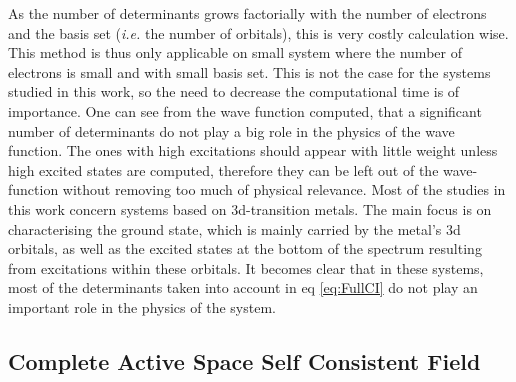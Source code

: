 \documentclass[12pt]{report}
\numberwithin{equation}{section}
\begin{document}
As the number of determinants grows factorially with the number of electrons and the basis set (\textit{i.e.} the number of orbitals), this is very costly calculation wise.
This method is thus only applicable on small system where the number of electrons is small and with small basis set.
This is not the case for the systems studied in this work, so the need to decrease the computational time is of importance.
One can see from the wave function computed, that a significant number of determinants do not play a big role in the physics of the wave function.
The ones with high excitations should appear with little weight unless high excited states are computed, therefore they can be left out of the wave-function without removing too much of physical relevance. 
Most of the studies in this work concern systems based on 3d-transition metals.
The main focus is on characterising the ground state, which is mainly carried by the metal's 3d orbitals, as well as the excited states at the bottom of the spectrum resulting from excitations within these orbitals.
It becomes clear that in these systems, most of the determinants taken into account in eq \ref{eq:FullCI} do not play an important role in the physics of the system.



\subsection{Complete Active Space Self Consistent Field}
\end{document}
